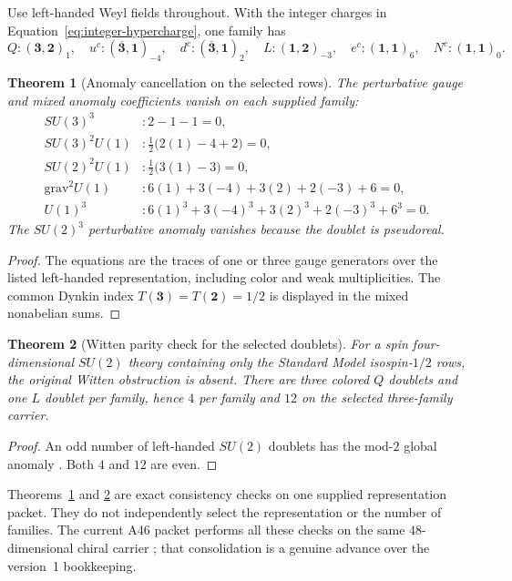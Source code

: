 \documentclass[11pt]{article}
\theoremstyle{plain}
\newtheorem{theorem}{Theorem}[section]
\theoremstyle{definition}
\theoremstyle{remark}
\begin{document}
Use left-handed Weyl fields throughout. With the integer charges in
Equation~\eqref{eq:integer-hypercharge}, one family has
\[
 Q:(\mathbf{3},\mathbf{2})_1,\quad
 u^c:(\overline{\mathbf{3}},\mathbf{1})_{-4},\quad
 d^c:(\overline{\mathbf{3}},\mathbf{1})_2,\quad
 L:(\mathbf{1},\mathbf{2})_{-3},\quad
 e^c:(\mathbf{1},\mathbf{1})_6,\quad
 N^c:(\mathbf{1},\mathbf{1})_0.
\]

\begin{theorem}[Anomaly cancellation on the selected rows]
\label{thm:anomaly-table}
The perturbative gauge and mixed anomaly coefficients vanish on each supplied
family:
\begin{align*}
 SU(3)^3 &: 2-1-1=0,\\
 SU(3)^2U(1) &: \tfrac12\bigl(2(1)-4+2\bigr)=0,\\
 SU(2)^2U(1) &: \tfrac12\bigl(3(1)-3\bigr)=0,\\
 \mathrm{grav}^2U(1) &: 6(1)+3(-4)+3(2)+2(-3)+6=0,\\
 U(1)^3 &: 6(1)^3+3(-4)^3+3(2)^3+2(-3)^3+6^3=0.
\end{align*}
The $SU(2)^3$ perturbative anomaly vanishes because the doublet is
pseudoreal.
\end{theorem}

\begin{proof}
The equations are the traces of one or three gauge generators over the listed
left-handed representation, including color and weak multiplicities. The
common Dynkin index $T(\mathbf3)=T(\mathbf2)=1/2$ is displayed in the mixed
nonabelian sums.
\end{proof}

\begin{theorem}[Witten parity check for the selected doublets]
\label{thm:witten}
For a spin four-dimensional $SU(2)$ theory containing only the Standard Model
isospin-$1/2$ rows, the original Witten obstruction is absent. There are three
colored $Q$ doublets and one $L$ doublet per family, hence $4$ per family and
$12$ on the selected three-family carrier.
\end{theorem}

\begin{proof}
An odd number of left-handed $SU(2)$ doublets has the mod-$2$ global anomaly
\cite{Witten1982}. Both $4$ and $12$ are even.
\end{proof}

Theorems~\ref{thm:anomaly-table} and \ref{thm:witten} are exact consistency
checks on one supplied representation packet. They do not independently select
the representation or the number of families. The current A46 packet performs
all these checks on the same $48$-dimensional chiral carrier
\cite{MTTChiralCarrier}; that consolidation is a genuine advance over the
version~1 bookkeeping.
\end{document}
